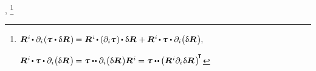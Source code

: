 , \footnote{%
${ \bm{R}^{\hspace{.1ex}i} \hspace{-0.25ex} \dotp \partial_i \hspace{-0.25ex} \left( \cauchystress \dotp \variation{\bm{R}} \hspace{.2ex} \right) \hspace{-0.15ex}
= \bm{R}^{\hspace{.1ex}i} \hspace{-0.25ex} \dotp \hspace{-0.1ex} \left( \partial_i \cauchystress \hspace{.12ex} \right) \hspace{-0.2ex} \dotp \variation{\bm{R}} \hspace{.15ex}
+ \hspace{-0.1ex} \bm{R}^{\hspace{.1ex}i} \hspace{-0.25ex} \dotp \hspace{-0.1ex} \cauchystress \dotp \partial_i \bigl( \variation{\bm{R}} \hspace{.2ex} \bigr)
\hspace{-0.1ex} , }$

 \hspace*{\fill}
${ \bm{R}^{\hspace{.1ex}i} \hspace{-0.25ex} \dotp \hspace{-0.1ex} \cauchystress \dotp \partial_i \bigl( \variation{\bm{R}} \hspace{.2ex} \bigr) \hspace{-0.2ex}
= \cauchystress \dotdotp \partial_i \bigl( \variation{\bm{R}} \hspace{.2ex} \bigr) \hspace{-0.1ex} \bm{R}^{\hspace{.1ex}i} \hspace{-0.1ex}
= \cauchystress \dotdotp \hspace{-0.12ex} \bigl( \bm{R}^{\hspace{.1ex}i} \partial_i \hspace{.12ex} \variation{\bm{R}} \hspace{.24ex} \bigr)^{\hspace{-0.33ex}\T} }$%
}

